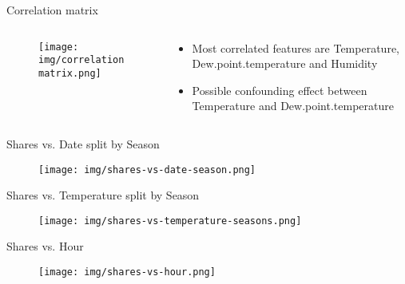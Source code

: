 \documentclass{minesbeamer}
\begin{document}
\begin{frame}{Correlation matrix}
    \begin{columns}
        \begin{column}{0.7\textwidth}
            \begin{figure}
                \centering
                \texttt{[image: img/correlation matrix.png]}
            \end{figure}
        \end{column}
        \begin{column}{0.3\textwidth}
            \begin{itemize}
                \item Most correlated features are Temperature, Dew.point.temperature and Humidity
                \item Possible confounding effect between Temperature and Dew.point.temperature
            \end{itemize}
        \end{column}
    \end{columns}
\end{frame}

\begin{frame}{Shares vs. Date split by Season}
    \begin{figure}
        \centering
        \texttt{[image: img/shares-vs-date-season.png]}
    \end{figure}
\end{frame}

\begin{frame}{Shares vs. Temperature split by Season}
    \begin{figure}
        \centering
        \texttt{[image: img/shares-vs-temperature-seasons.png]}
    \end{figure}
\end{frame}

\begin{frame}{Shares vs. Hour}
    \begin{figure}
        \centering
        \texttt{[image: img/shares-vs-hour.png]}
    \end{figure}
\end{frame}
\end{document}
